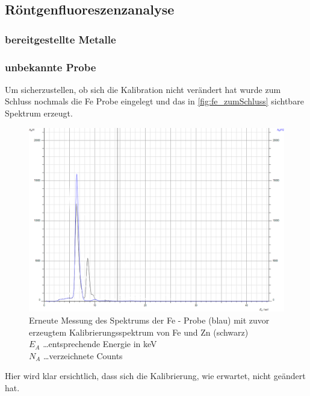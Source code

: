 \documentclass[12pt,english,ngerman]{scrartcl}
\begin{document}
\subsection{Röntgenfluoreszenzanalyse}

\subsubsection{bereitgestellte Metalle}


\subsubsection{unbekannte Probe}

Um sicherzustellen, ob sich die Kalibration nicht verändert hat wurde zum Schluss nochmals die Fe Probe eingelegt
und das in \autoref{fig:fe_zumSchluss} sichtbare Spektrum erzeugt.

\begin{figure}[H]
	\begin{center}
		\includegraphics[width =\textwidth]{./figures/roentgen/KalibrieungErhaltenFe.png}
	\end{center}
	\caption[Erneute Messung des Spektrums der Fe - Probe]
	{Erneute Messung des Spektrums der Fe - Probe (blau) mit 
	zuvor erzeugtem Kalibrierungsspektrum von Fe und Zn (schwarz) \\
	$E_A$ \dots entsprechende Energie in keV\\
	$N_A$ \dots verzeichnete Counts
	}\label{fig:fe_zumSchluss}
\end{figure}

Hier wird klar ersichtlich, dass sich die Kalibrierung, wie erwartet, nicht geändert hat.
\end{document}
